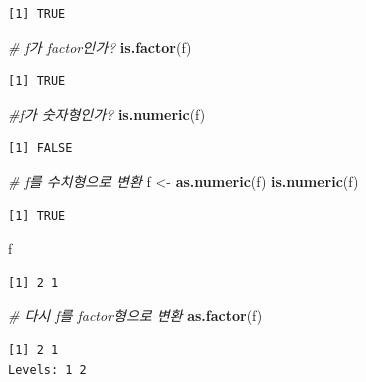 \documentclass[
  11pt,
]{krantz}
\newenvironment{Shaded}{\begin{snugshade}}{\end{snugshade}}
\newcommand{\CommentTok}[1]{\textcolor[rgb]{0.37,0.37,0.37}{\textit{#1}}}
\newcommand{\KeywordTok}[1]{\textcolor[rgb]{0.27,0.27,0.27}{\textbf{#1}}}
\newcommand{\NormalTok}[1]{#1}
\newcommand{\StringTok}[1]{\textcolor[rgb]{0.5,0.5,0.5}{#1}}
\begin{document}
\begin{verbatim}
[1] TRUE
\end{verbatim}

\begin{Shaded}
\begin{Highlighting}[]
\CommentTok{# f가 factor인가?}
\KeywordTok{is.factor}\NormalTok{(f)}
\end{Highlighting}
\end{Shaded}

\begin{verbatim}
[1] TRUE
\end{verbatim}

\begin{Shaded}
\begin{Highlighting}[]
\CommentTok{#f가 숫자형인가?}
\KeywordTok{is.numeric}\NormalTok{(f)}
\end{Highlighting}
\end{Shaded}

\begin{verbatim}
[1] FALSE
\end{verbatim}

\begin{Shaded}
\begin{Highlighting}[]
\CommentTok{# f를 수치형으로 변환}
\NormalTok{f <-}\StringTok{ }\KeywordTok{as.numeric}\NormalTok{(f)}
\KeywordTok{is.numeric}\NormalTok{(f)}
\end{Highlighting}
\end{Shaded}

\begin{verbatim}
[1] TRUE
\end{verbatim}

\begin{Shaded}
\begin{Highlighting}[]
\NormalTok{f}
\end{Highlighting}
\end{Shaded}

\begin{verbatim}
[1] 2 1
\end{verbatim}

\begin{Shaded}
\begin{Highlighting}[]
\CommentTok{# 다시 f를 factor형으로 변환}
\KeywordTok{as.factor}\NormalTok{(f)}
\end{Highlighting}
\end{Shaded}

\begin{verbatim}
[1] 2 1
Levels: 1 2
\end{verbatim}
\end{document}
